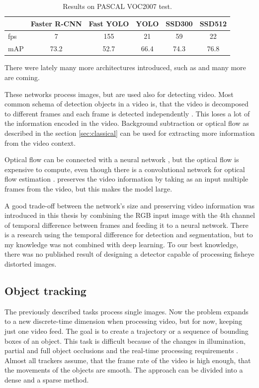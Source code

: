 \documentclass[a4paper,11pt,titlepage,twoside]{article}
\numberwithin{figure}{section}
\begin{document}
\begin{table}
\centering
\begin{tabular}{|l|c|c|c|c|c|}
  \hline
  &Faster R-CNN & Fast YOLO & YOLO & SSD300 & SSD512 \\
  \hline
  fps & 7 & 155 & 21 & 59 & 22\\
  \hline
  mAP & 73.2 & 52.7 & 66.4 & 74.3 & 76.8\\
  \hline
\end{tabular}
\caption{Results on PASCAL VOC2007 test.}
\end{table}

There were lately many more architectures introduced, such as \cite{lin2017focal, li2017fssd, dai2016r} and many more are coming.

These networks process images, but are used also for detecting video. Most common schema of detection objects in a video is, that the video is decomposed to different frames and each frame is detected independently \cite{sudowe2011efficient}. This loses a lot of the information encoded in the video. Background subtraction \cite{gonzalez2012digital} or optical flow \cite{naoya1990optical} as described in the section \ref{sec:classical} can be used for extracting more information from the video context. 

Optical flow can be connected with a neural network \cite{ng2015beyond}, but the optical flow is expensive to compute, even though there is a convolutional network for optical flow estimation \cite{simonyan2014two}. \cite{karpathy2014large} preserves the video information by taking as an input multiple frames from the video, but this makes the model large. 

A good trade-off between the network's size and preserving video information was introduced in this thesis by combining the RGB input image with the 4th channel of temporal difference between frames and feeding it to a neural network. There is a research \cite{bayona2010stationary, koprinska2001temporal} using the temporal difference for detection and segmentation, but to my knowledge was not combined with deep learning. To our best knowledge, there was no published result of designing a detector capable of processing fisheye distorted images. 

\subsection{Object tracking}
\label{sec:object-tracking}

The previously described tasks process single images. Now the problem expands to a new discrete-time dimension when processing video, but for now, keeping just one video feed. The goal is to create a trajectory or a sequence of bounding boxes of an object. This task is difficult because of the changes in illumination, partial and full object occlusions and the real-time processing requirements \cite{yilmaz2006object}. Almost all trackers assume, that the frame rate of the video is high enough, that the movements of the objects are smooth. The approach can be divided into a dense and a sparse method. 
\end{document}
